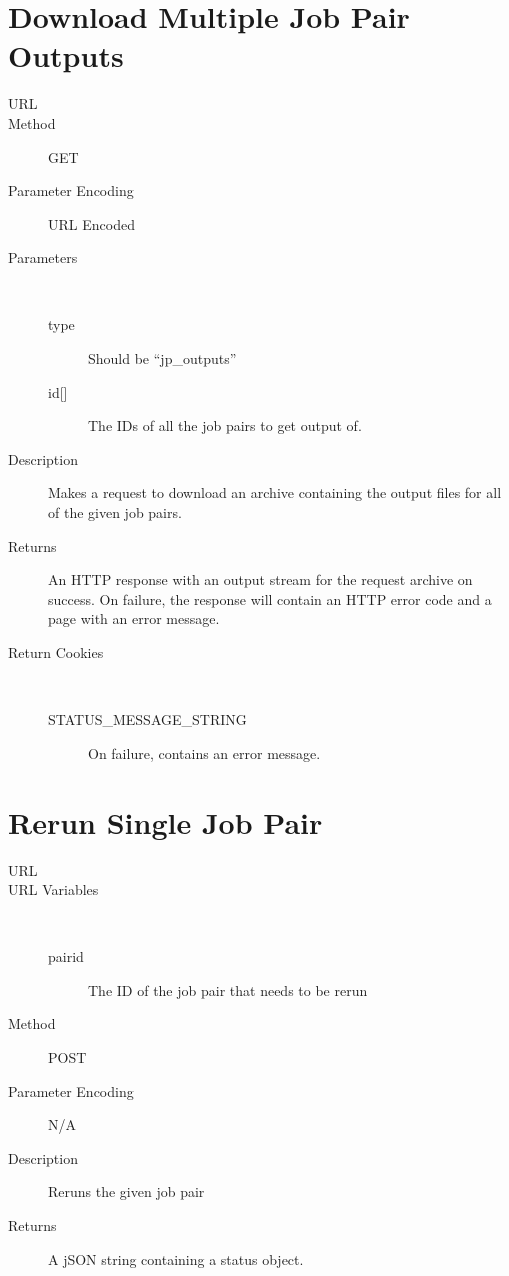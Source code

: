 \section{Download Multiple Job Pair Outputs}
\begin{description}
\item [URL] 
\item [Method] GET
\item [Parameter Encoding] URL Encoded
\item [Parameters] \
	\begin{description}
	\item [type]  Should be “jp\_outputs”
	\item [{id[]}]  The IDs of all the job pairs to get output of.
	\end{description}
\item [Description] Makes a request to download an archive containing the output files for all of the given job pairs.
\item [Returns] An HTTP response with an output stream for the request archive on success. On failure, the response will contain an HTTP error code and a page with an error message.
\item [Return Cookies] \
	\begin{description}
	\item [STATUS\_MESSAGE\_STRING]  On failure, contains an error message.
	\end{description}
\end{description}


\section{Rerun Single Job Pair}
\begin{description}
\item [URL] 
\item [URL Variables] \
	\begin{description}
	\item [pairid] \type{Integer} The ID of the job pair that needs to be rerun
	\end{description}
\item [Method] POST
\item [Parameter Encoding] N/A
\item [Description] Reruns the given job pair
\item [Returns] A jSON string containing a status object.
\end{description}


